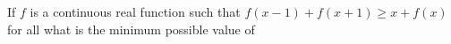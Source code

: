 If $f$ is a continuous real function such that $ f(x-1) + f(x+1) \ge x + f(x) $ for all  what is the minimum possible value of 